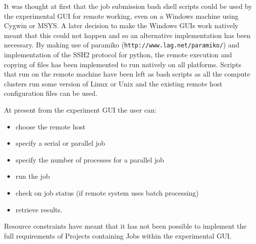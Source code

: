 It was thought at first that the job submission bash shell scripts could be used by the experimental GUI for remote working, even on a Windows machine using Cygwin or MSYS. A later decision to make the Windows GUIs work natively meant that this could not happen and so an alternative implementation has been necessary. By making use of paramiko (\verb+http://www.lag.net/paramiko/+) and implementation of the SSH2 protocol for python, the remote execution and copying of files has been implemented to run natively on all platforms.  Scripts that run on the remote machine have been left as bash scripts as all the compute clusters run some version of Linux or Unix and the existing remote host configuration files can be used. 

At present from the experiment GUI the user can:

\begin{itemize}
\item choose the remote host
\item specify a serial or parallel job
\item specify the number of processes for a parallel job
\item run the job
\item check on job status (if remote system uses batch processing)
\item retrieve results.
\end{itemize}

Resource constraints have meant that it has not been possible to implement the full requirements of Projects containing Jobs within the experimental GUI.

